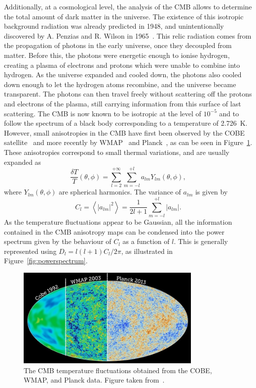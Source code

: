 Additionally, at a cosmological level, the analysis of the \ac{CMB} allows to determine the total amount of dark matter in the universe. The existence of this isotropic background radiation was already predicted in 1948, and unintentionally discovered by A. Penzias and R. Wilson in 1965~\cite{Penzias:1965wn}. This relic radiation comes from the propagation of photons in the early universe, once they decoupled from matter. Before this, the photons were energetic enough to ionise hydrogen, creating a plasma of electrons and protons which were unable to combine into hydrogen. As the universe expanded and cooled down, the photons also cooled down enough to let the hydrogen atoms recombine, and the universe became transparent. The photons can then travel freely without scattering off the protons and electrons of the plasma, still carrying information from this surface of last scattering. The \ac{CMB} is now known to be isotropic at the level of $10^{-5}$ and to follow the spectrum of a black body corresponding to a temperature of 2.726~K. However, small anisotropies in the \ac{CMB} have first been observed by the COBE satellite~\cite{Smoot:1992td} and more recently by WMAP~\cite{Komatsu:2010fb} and Planck~\cite{Ade:2013zuv}, as can be seen in Figure~\ref{fig:CMB}. These anisotropies correspond to small thermal variations, and are usually expanded as
\begin{equation}
 \frac{\delta T}{T}(\theta, \phi) = \sum_{l=2}^{+\infty}\sum_{m=-l}^{+l} a_{lm} Y_{lm}(\theta, \phi), 
\end{equation}
where $Y_{lm}(\theta, \phi)$ are spherical harmonics. %
The variance of $a_{lm}$ is given by
\begin{equation}
 C_l = \left\langle|a_{lm}|^2\right\rangle = \frac{1}{2l+1}\sum_{m=-l}^{+l} 
|a_{lm}|.
\end{equation}
As the temperature fluctuations appear to be Gaussian, all the information contained in the \ac{CMB} anisotropy maps can be condensed into the power spectrum given by the behaviour of $C_l$ as a function of $l$. This is generally represented using $D_l = l(l+1)C_l/2\pi$, as illustrated in Figure~\ref{fig:powerspectrum}.

\begin{figure}[ht]
  \centering
  \includegraphics[width=0.8\textwidth]{cmb1.jpg}\hfill%
  \caption{The \ac{CMB} temperature fluctuations obtained from the COBE, WMAP, and Planck data. Figure taken from~\cite{CMB}.}
  \label{fig:CMB}
\end{figure}

